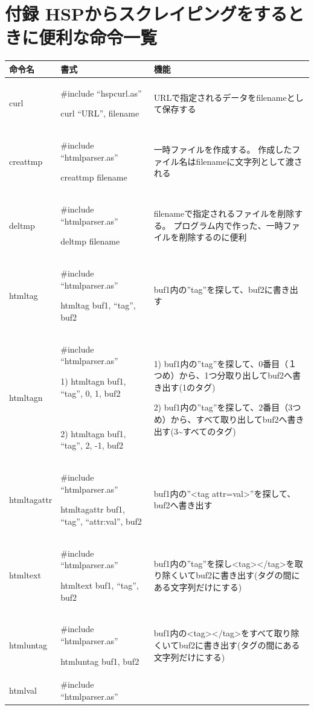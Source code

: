 \documentclass[a4paper,12pt,dvipdfmx]{jarticle}
\begin{document}
\bigskip

\clearpage\section{付録
HSPからスクレイピングをするときに便利な命令一覧}
\begin{center}
\tablefirsthead{}
\tablehead{}
\tabletail{}
\tablelasttail{}
\begin{supertabular}{|m{2.349cm}|m{7.57cm}|m{6.487cm}|}
\hline
命令名 &
書式 &
機能\\\hline
curl &
\#include “hspcurl.as”

curl “URL”, filename &
URLで指定されるデータをfilenameとして保存する\\\hline
creattmp &
\#include “htmlparser.as”

creattmp filename &
一時ファイルを作成する。
	作成したファイル名はfilenameに文字列として渡される\\\hline
deltmp &
\#include “htmlparser.as”

deltmp filename &
filenameで指定されるファイルを削除する。
	プログラム内で作った、一時ファイルを削除するのに便利\\\hline
htmltag &
\#include “htmlparser.as”

htmltag buf1, “tag”, buf2 &
buf1内の”tag”を探して、buf2に書き出す\\\hline
htmltagn &
\#include “htmlparser.as”

1) htmltagn buf1, “tag”, 0, 1, buf2

~

2) htmltagn buf1, “tag”, 2, -1, buf2 &
1)
buf1内の”tag”を探して、0番目（１つめ）から、1つ分取り出してbuf2へ書き出す(1のタグ)

2)
buf1内の”tag”を探して、2番目（3つめ）から、すべて取り出してbuf2へ書き出す(3\~{}すべてのタグ)\\\hline
htmltagattr &
\#include “htmlparser.as”

htmltagattr buf1, “tag”, “attr:val”, buf2 &
buf1内の”{\textless}tag
attr=val{\textgreater}”を探して、buf2へ書き出す\\\hline
htmltext &
\#include “htmlparser.as”

htmltext buf1, “tag”, buf2 &
buf1内の”tag”を探し{\textless}tag{\textgreater}{\textless}/tag{\textgreater}を取り除くいてbuf2に書き出す(タグの間にある文字列だけにする)\\\hline
htmluntag &
\#include “htmlparser.as”

htmluntag buf1, buf2 &
buf1内の{\textless}tag{\textgreater}{\textless}/tag{\textgreater}をすべて取り除くいてbuf2に書き出す(タグの間にある文字列だけにする)\\\hline
htmlval &
\#include “htmlparser.as”


\end{supertabular}
\end{center}
\end{document}
